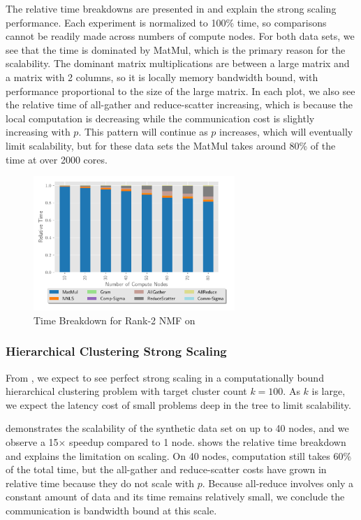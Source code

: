 The relative time breakdowns are presented in  and explain the strong scaling performance.
Each experiment is normalized to 100\% time, so comparisons cannot be readily made across numbers of compute nodes. 
For both data sets, we see that the time is dominated by MatMul, which is the primary reason for the scalability.
The dominant matrix multiplications are between a large matrix and a matrix with 2 columns, so it is locally memory bandwidth bound, with performance proportional to the size of the large matrix.
In each plot, we also see the relative time of all-gather and reduce-scatter increasing, which is because the local computation is decreasing while the communication cost is slightly increasing with $p$.
This pattern will continue as $p$ increases, which will eventually limit scalability, but for these data sets the MatMul takes around 80\% of the time at over 2000 cores.

\begin{figure}
\begin{center}
\includegraphics[height=2in, width=\columnwidth]{plots/realworld_rank2_strongscaling.pdf}
\caption{Time Breakdown for Rank-2 NMF on \image{}}
\label{fig:rwrank2strongscaling}
\end{center}
\end{figure}


\subsubsection{Hierarchical Clustering Strong Scaling}
\label{sec:hiernmf2scaling}

From , we expect to see perfect strong scaling in a computationally bound hierarchical clustering problem with target cluster count $k=100$.
As $k$ is large, we expect the latency cost of small problems deep in the tree to limit scalability.

 demonstrates the scalability of the synthetic data set on up to 40 nodes, and we observe a 15$\times$ speedup compared to 1 node.
 shows the relative time breakdown and explains the limitation on scaling.
On 40 nodes, computation still takes 60\% of the total time, but the all-gather and reduce-scatter costs have grown in relative time because they do not scale with $p$.
Because all-reduce involves only a constant amount of data and its time remains relatively small, we conclude the communication is bandwidth bound at this scale.

